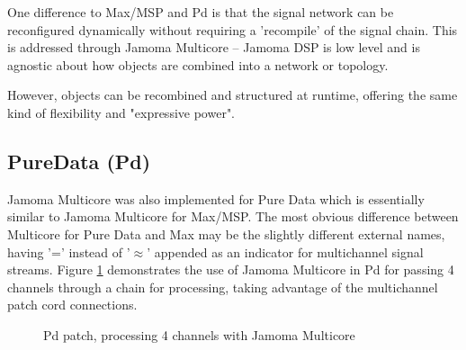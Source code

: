 \documentclass[twoside,a4paper]{article}
\begin{document}



One difference to Max/MSP and Pd is that the signal network can be reconfigured dynamically without requiring a 'recompile' of the signal chain.  
This is addressed through Jamoma Multicore -- Jamoma DSP is low level and is agnostic about how objects are combined into a network or topology.

However, objects can be recombined and structured at runtime, offering the same kind of flexibility and "expressive power".


\subsection{PureData (Pd)} %

Jamoma Multicore was also implemented for Pure Data which is essentially similar to Jamoma Multicore for Max/MSP. 
The most obvious difference between Multicore for Pure Data and Max may be the slightly different external names, having '=' instead of '$\approx$' appended as an indicator for multichannel signal streams. 
Figure \ref{fig:pd} demonstrates the use of Jamoma Multicore in Pd for passing 4 channels through a chain for processing, taking advantage of the multichannel patch cord connections.  

\begin{figure}[htbp]
\centerline{}
\caption{Pd patch, processing 4 channels with Jamoma Multicore}
\label{fig:pd}
\end{figure}
\end{document}
